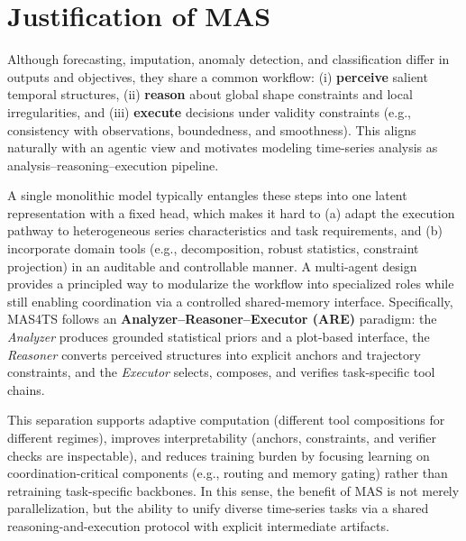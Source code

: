 \section{Justification of MAS}
Although forecasting, imputation, anomaly detection, and classification differ in outputs and objectives, they share a common workflow: (i) \textbf{perceive} salient temporal structures, (ii) \textbf{reason} about global shape constraints and local irregularities, and (iii) \textbf{execute} decisions under validity constraints (e.g., consistency with observations, boundedness, and smoothness). This aligns naturally with an agentic view and motivates modeling time-series analysis as analysis--reasoning--execution pipeline.

A single monolithic model typically entangles these steps into one latent representation with a fixed head, which makes it hard to (a) adapt the execution pathway to heterogeneous series characteristics and task requirements, and (b) incorporate domain tools (e.g., decomposition, robust statistics, constraint projection) in an auditable and controllable manner. A multi-agent design provides a principled way to modularize the workflow into specialized roles while still enabling coordination via a controlled shared-memory interface. Specifically, MAS4TS follows an \textbf{Analyzer--Reasoner--Executor (ARE)} paradigm: the \emph{Analyzer} produces grounded statistical priors and a plot-based interface, the \emph{Reasoner} converts perceived structures into explicit anchors and trajectory constraints, and the \emph{Executor} selects, composes, and verifies task-specific tool chains.

This separation supports adaptive computation (different tool compositions for different regimes), improves interpretability (anchors, constraints, and verifier checks are inspectable), and reduces training burden by focusing learning on coordination-critical components (e.g., routing and memory gating) rather than retraining task-specific backbones. In this sense, the benefit of MAS is not merely parallelization, but the ability to unify diverse time-series tasks via a shared reasoning-and-execution protocol with explicit intermediate artifacts.